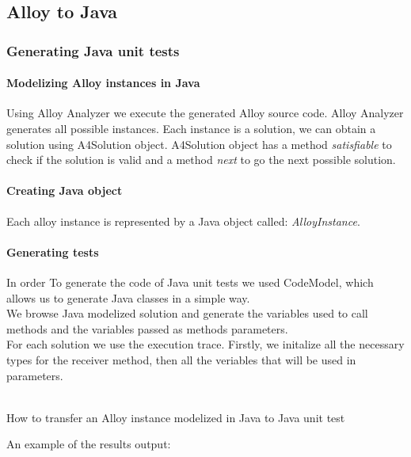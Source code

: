 \subsection{Alloy to Java}
\subsubsection{Generating Java unit tests}
\paragraph{Modelizing Alloy instances in Java}
Using Alloy Analyzer we execute the generated Alloy source code. Alloy Analyzer generates all possible instances.
Each instance is a solution, we can obtain a solution using A4Solution object. A4Solution object has a method \textit{satisfiable} to check if the solution is valid and a method \textit{next} to go the next possible solution.

\paragraph{Creating Java object}
Each alloy instance is represented by a Java object called: \textit{AlloyInstance}.

\paragraph{Generating tests}
In order To generate the code of Java unit tests we used CodeModel, which allows us to generate Java classes in a simple way.\\
We browse Java modelized solution and generate the variables used to call methods and the variables passed as methods parameters.\\
For each solution we use the execution trace.
Firstly, we initalize all the necessary types for the receiver method, then all the veriables that will be used in parameters. \\~\\
\begin{algorithm}[H]
\SetAlgoLined
{}
\caption{How to transfer an Alloy instance modelized in Java to Java unit test}
\end{algorithm}
\bigskip
\bigskip
An example of the results output:

